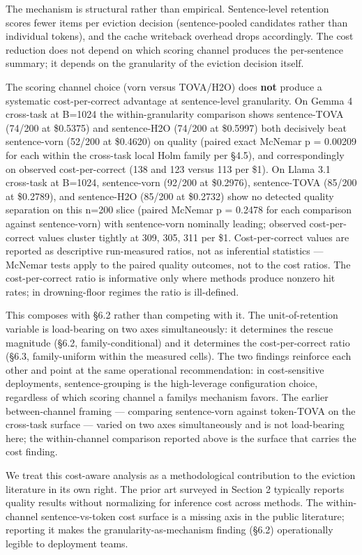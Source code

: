 \documentclass[
]{article}
\begin{document}
The mechanism is structural rather than empirical. Sentence-level
retention scores fewer items per eviction decision (sentence-pooled
candidates rather than individual tokens), and the cache writeback
overhead drops accordingly. The cost reduction does not depend on which
scoring channel produces the per-sentence summary; it depends on the
granularity of the eviction decision itself.

The scoring channel choice (vorn versus TOVA/H2O) does
\textbf{not} produce a systematic cost-per-correct advantage at
sentence-level granularity. On Gemma 4 cross-task at B=1024 the
within-granularity comparison shows sentence-TOVA (74/200 at
\$0.5375) and sentence-H2O (74/200 at \$0.5997) both decisively
beat sentence-vorn (52/200 at \$0.4620) on quality (paired exact McNemar
p = 0.00209 for each within the cross-task local Holm family per §4.5),
and correspondingly on observed cost-per-correct (138 and 123 versus 113
per \$1). On Llama 3.1 cross-task at B=1024, sentence-vorn (92/200 at
\$0.2976), sentence-TOVA (85/200 at \$0.2789), and
sentence-H2O (85/200 at \$0.2732) show no detected quality
separation on this n=200 slice (paired McNemar p = 0.2478 for each
comparison against sentence-vorn) with sentence-vorn nominally leading;
observed cost-per-correct values cluster tightly at 309, 305, 311 per
\$1. Cost-per-correct values are reported as descriptive run-measured
ratios, not as inferential statistics --- McNemar tests apply to the
paired quality outcomes, not to the cost ratios. The cost-per-correct
ratio is informative only where methods produce nonzero hit rates; in
drowning-floor regimes the ratio is ill-defined.

This composes with §6.2 rather than competing with it. The
unit-of-retention variable is load-bearing on two axes simultaneously:
it determines the rescue magnitude (§6.2, family-conditional) and it
determines the cost-per-correct ratio (§6.3, family-uniform within the
measured cells). The two findings reinforce each other and point at the
same operational recommendation: in cost-sensitive deployments,
sentence-grouping is the high-leverage configuration choice, regardless
of which scoring channel a family\textquotesingle s mechanism favors.
The earlier between-channel framing --- comparing sentence-vorn against
token-TOVA on the cross-task surface --- varied on two axes
simultaneously and is not load-bearing here; the within-channel
comparison reported above is the surface that carries the cost finding.

We treat this cost-aware analysis as a methodological contribution to
the eviction literature in its own right. The prior art surveyed in
Section 2 typically reports quality results without normalizing for
inference cost across methods. The within-channel sentence-vs-token cost
surface is a missing axis in the public literature; reporting it makes
the granularity-as-mechanism finding (§6.2) operationally legible to
deployment teams.
\end{document}
